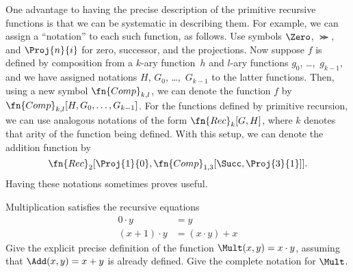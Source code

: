 \documentclass[../../../include/open-logic-section]{subfiles}
\begin{document}
\begin{explain}
One advantage to having the precise description of the primitive
recursive functions is that we can be systematic in describing them.
For example, we can assign a ``notation'' to each such function, as
follows. Use symbols $\Zero$, $\Succ$, and $\Proj{n}{i}$ for zero,
successor, and the projections. Now suppose $f$ is defined by
composition from a $k$-ary function~$h$ and $l$-ary functions $g_0$,
\dots,~$g_{k-1}$, and we have assigned notations $H$, $G_0$,
\dots,~$G_{k-1}$ to the latter functions. Then, using a new symbol
$\fn{Comp}_{k,l}$, we can denote the function $f$ by
$\fn{Comp}_{k,l}[H,G_0,\dots,G_{k-1}]$. For the functions defined by
primitive recursion, we can use analogous notations of the form
$\fn{Rec}_k[G,H]$, where $k$ denotes that arity of the function being
defined. With this setup, we can denote the addition function by
\[
\fn{Rec}_2[\Proj{1}{0},\fn{Comp}_{1,3}[\Succ,\Proj{3}{1}]].
\]
Having these notations sometimes proves useful.
\end{explain}

\begin{prob}
Multiplication satisfies the recursive equations
\begin{align*}
  0 \cdot y & = y\\
  (x+1) \cdot y & = (x \cdot y) + x
\end{align*}
Give the explicit precise definition of the function $\Mult(x, y) =
x\cdot y$, assuming that $\Add(x, y) = x + y$ is already defined. Give
the complete notation for $\Mult$.
\end{prob}
\end{document}
